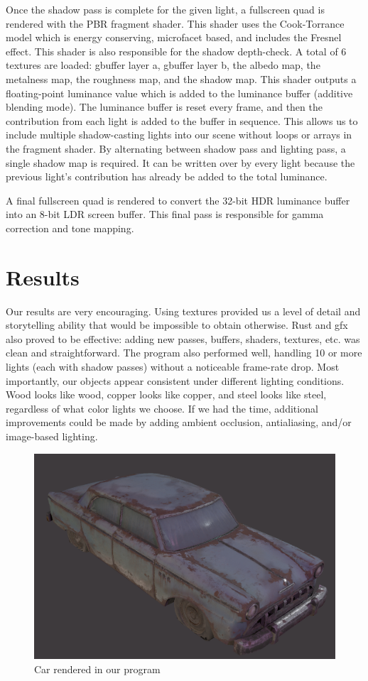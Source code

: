 \documentclass[12pt, letterpaper, twocolumn]{article}
\begin{document}
Once the shadow pass is complete for the given light, a fullscreen quad is
rendered with the PBR fragment shader. This shader uses the Cook-Torrance
model which is energy conserving, microfacet based, and includes the Fresnel
effect\cite{CoTor}. This shader is also responsible for the shadow depth-check.
A total of 6 textures are loaded: gbuffer layer a, gbuffer layer b, the
albedo map, the metalness map, the roughness map, and the shadow map. This
shader outputs a floating-point luminance value which is added to the
luminance buffer (additive blending mode). The luminance buffer is reset every
frame, and then the contribution from each light is added to the buffer in
sequence. This allows us to include multiple shadow-casting lights into our
scene without loops or arrays in the fragment shader. By alternating between
shadow pass and lighting pass, a single shadow map is required. It can be
written over by every light because the previous light’s contribution has
already be added to the total luminance.

A final fullscreen quad is rendered to convert the 32-bit HDR luminance buffer
into an 8-bit LDR screen buffer. This final pass is responsible for gamma
correction and tone mapping.

\section{Results}

Our results are very encouraging. Using textures provided us a level of detail
and storytelling ability that would be impossible to obtain otherwise. Rust
and gfx also proved to be effective: adding new passes, buffers, shaders,
textures, etc. was clean and straightforward. The program also performed well,
handling 10 or more lights (each with shadow passes) without a noticeable
frame-rate drop. Most importantly, our objects appear consistent under
different lighting conditions. Wood looks like wood, copper looks like copper,
and steel looks like steel, regardless of what color lights we choose. If we
had the time, additional improvements could be made by adding ambient
occlusion, antialiasing, and/or image-based lighting.

\begin{figure}
\centering \includegraphics[width=0.5 \textwidth]{pbr_car_02.png}
\caption{Car rendered in our program}
\label{scrot}
\end{figure}
\end{document}
